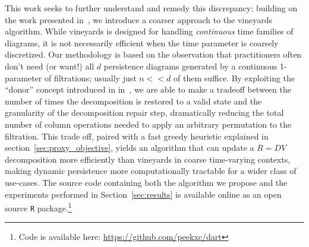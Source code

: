 \documentclass{article} %
\begin{document}
This work seeks to further understand and remedy this discrepancy: building on the work presented in~\cite{busaryev2010tracking}, we introduce a coarser approach to the vineyards algorithm.
While vineyards is  designed  for handling   \emph{continuous} time families of diagrams, it is not necessarily efficient when the time parameter is coarsely discretized.
Our methodology is based on the observation that practitioners often don't need (or want!) all $d$ persistence diagrams generated by a continuous 1-parameter of filtrations; usually just $n << d$ of them  suffice.   
By exploiting the ``donor'' concept introduced in in~\cite{busaryev2010tracking}, we are able to make a tradeoff between the number of times the decomposition is restored to a valid state and the granularity of the decomposition repair step, dramatically reducing the total number of column operations needed to apply an arbitrary permutation to the filtration. This trade off, paired with a fast greedy heuristic explained in section~\ref{sec:proxy_objective}, yields an algorithm that can update a $R = DV$ decomposition more efficiently than vineyards in coarse time-varying contexts, making dynamic persistence more computationally tractable for a wider class of use-cases. 
The source code containing both the algorithm we propose and the experiments performed in Section~\ref{sec:results} is available online as an open source \texttt{R} package.\footnote{ Code is available here: \url{https://github.com/peekxc/dart}}
 
\end{document}
